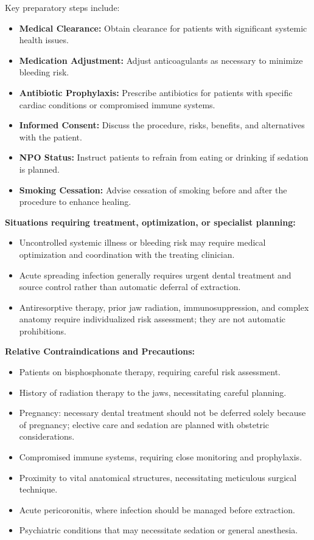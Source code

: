Key preparatory steps include:

\begin{itemize}
  \item \textbf{Medical Clearance:} Obtain clearance for patients with significant systemic health issues.
  \item \textbf{Medication Adjustment:} Adjust anticoagulants as necessary to minimize bleeding risk.
  \item \textbf{Antibiotic Prophylaxis:} Prescribe antibiotics for patients with specific cardiac conditions or compromised immune systems.
  \item \textbf{Informed Consent:} Discuss the procedure, risks, benefits, and alternatives with the patient.
  \item \textbf{NPO Status:} Instruct patients to refrain from eating or drinking if sedation is planned.
  \item \textbf{Smoking Cessation:} Advise cessation of smoking before and after the procedure to enhance healing.
\end{itemize}

\textbf{Situations requiring treatment, optimization, or specialist planning:}

\begin{itemize}
  \item Uncontrolled systemic illness or bleeding risk may require medical optimization and coordination with the treating clinician.
  \item Acute spreading infection generally requires urgent dental treatment and source control rather than automatic deferral of extraction.
  \item Antiresorptive therapy, prior jaw radiation, immunosuppression, and complex anatomy require individualized risk assessment; they are not automatic prohibitions.
\end{itemize}

\textbf{Relative Contraindications and Precautions:}

\begin{itemize}
  \item Patients on bisphosphonate therapy, requiring careful risk assessment.
  \item History of radiation therapy to the jaws, necessitating careful planning.
  \item Pregnancy: necessary dental treatment should not be deferred solely because of pregnancy; elective care and sedation are planned with obstetric considerations.
  \item Compromised immune systems, requiring close monitoring and prophylaxis.
  \item Proximity to vital anatomical structures, necessitating meticulous surgical technique.
  \item Acute pericoronitis, where infection should be managed before extraction.
  \item Psychiatric conditions that may necessitate sedation or general anesthesia.
\end{itemize}

